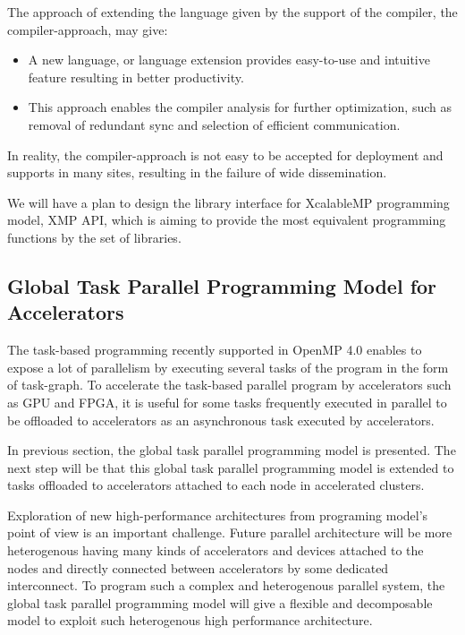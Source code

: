 ﻿\documentclass[graybox]{svmult}
\begin{document}
The approach of extending the language given by the support of the compiler, the compiler-approach, may give:
\begin{itemize}
\item A new language, or language extension provides easy-to-use and intuitive feature resulting in better productivity.
\item This approach enables the compiler analysis for further optimization, such as removal of redundant sync and selection of efficient communication.
\end{itemize}

In reality, the compiler-approach is not easy to be accepted for deployment and supports in many sites, resulting in the failure of wide dissemination.

We will have a plan to design the library interface for XcalableMP programming model, XMP API, which is aiming to provide the most equivalent programming functions by the set of libraries. 

\subsection{Global Task Parallel Programming Model for Accelerators}

The task-based programming recently supported in OpenMP 4.0 enables to expose a lot of parallelism by executing several tasks of the program in the form of task-graph. To accelerate the task-based parallel program by accelerators such as GPU and FPGA, it is useful for some tasks frequently executed in parallel to be offloaded to accelerators as an asynchronous task executed by accelerators. 

In previous section, the global task parallel programming model is presented. The next step will be that this global task parallel programming model is extended to tasks offloaded to accelerators attached to each node in accelerated clusters. 

Exploration of new high-performance architectures from programing model’s point of view is an important challenge. Future parallel architecture will be more heterogenous having many kinds of accelerators and devices attached to the nodes and directly connected between accelerators by some dedicated interconnect. To program such a complex and heterogenous parallel system, the global task parallel programming model will give a flexible and decomposable model to exploit such heterogenous high performance architecture.
\end{document}
